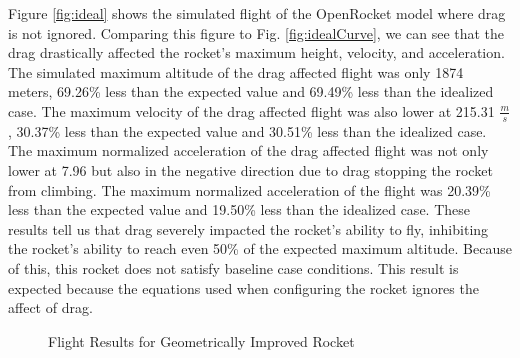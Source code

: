 \documentclass{report}
\begin{document}
\noindent Figure \ref{fig:ideal} shows the simulated flight of the OpenRocket model where drag is not ignored.
Comparing this figure to Fig. \ref{fig:idealCurve}, we can see that the drag drastically affected the rocket's maximum height, velocity, and acceleration.
The simulated maximum altitude of the drag affected flight was only 1874 meters, 69.26\% less than the expected value and 69.49\% less than the idealized case.
The maximum velocity of the drag affected flight was also lower at 215.31 $\frac{m}{s}$, 30.37\% less than the expected value and 30.51\% less than the idealized case.
The maximum normalized acceleration of the drag affected flight was not only lower at 7.96 but also in the negative direction due to drag stopping the rocket from climbing.
The maximum normalized acceleration of the flight was 20.39\% less than the expected value and 19.50\% less than the idealized case.
These results tell us that drag severely impacted the rocket's ability to fly, inhibiting the rocket's ability to reach even 50\% of the expected maximum altitude.
Because of this, this rocket does not satisfy baseline case conditions.
This result is expected because the equations used when configuring the rocket ignores the affect of drag.\\

\begin{figure}[h!]
    \centering
    \caption{Flight Results for Geometrically Improved Rocket}
    \label{fig:geoImprov}
\end{figure}
\end{document}
